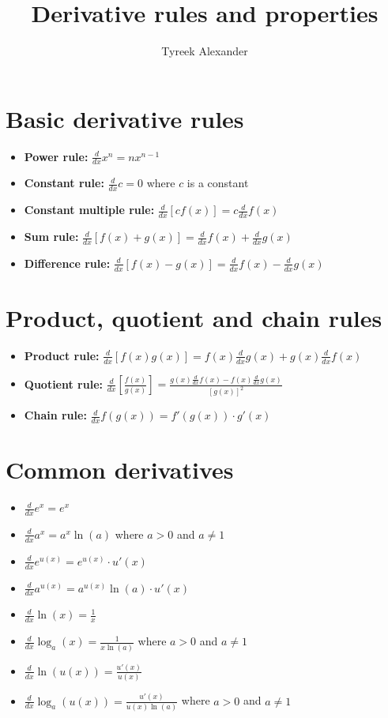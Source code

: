 \documentclass{article}
\title{Derivative rules and properties}
\author{}
\date{}
\begin{document}
\author{Tyreek Alexander}

\maketitle

\section*{Basic derivative rules}

\begin{itemize}
    \item \textbf{Power rule:} \(\frac{d}{dx} x^n = nx^{n-1}\)
    \item \textbf{Constant rule:} \(\frac{d}{dx} c = 0\) where \(c\) is a constant
    \item \textbf{Constant multiple rule:} \(\frac{d}{dx} [cf(x)] = c \frac{d}{dx} f(x)\)
    \item \textbf{Sum rule:} \(\frac{d}{dx} [f(x) + g(x)] = \frac{d}{dx} f(x) + \frac{d}{dx} g(x)\)
    \item \textbf{Difference rule:} \(\frac{d}{dx} [f(x) - g(x)] = \frac{d}{dx} f(x) - \frac{d}{dx} g(x)\)
\end{itemize}

\section*{Product, quotient and chain rules}

\begin{itemize}
    \item \textbf{Product rule:} \(\frac{d}{dx} [f(x)g(x)] = f(x) \frac{d}{dx} g(x) + g(x) \frac{d}{dx} f(x)\)
    \item \textbf{Quotient rule:} \(\frac{d}{dx} \left[ \frac{f(x)}{g(x)} \right] = \frac{g(x) \frac{d}{dx} f(x) - f(x) \frac{d}{dx} g(x)}{[g(x)]^2}\)
    \item \textbf{Chain rule:} \(\frac{d}{dx} f(g(x)) = f'(g(x)) \cdot g'(x)\)
\end{itemize}

\section*{Common derivatives}

\begin{itemize}
    \item \(\frac{d}{dx} e^x = e^x\)
    \item \(\frac{d}{dx} a^x = a^x \ln(a)\) where \(a > 0\) and \(a \neq 1\)
    \item \(\frac{d}{dx} e^{u(x)} = e^{u(x)} \cdot u'(x)\)
    \item \(\frac{d}{dx} a^{u(x)} = a^{u(x)} \ln(a) \cdot u'(x)\)
    \item \(\frac{d}{dx} \ln(x) = \frac{1}{x}\)
    \item \(\frac{d}{dx} \log_a(x) = \frac{1}{x \ln(a)}\) where \(a > 0\) and \(a \neq 1\)
    \item \(\frac{d}{dx} \ln(u(x)) = \frac{u'(x)}{u(x)}\)
    \item \(\frac{d}{dx} \log_a(u(x)) = \frac{u'(x)}{u(x) \ln(a)}\) where \(a > 0\) and \(a \neq 1\)
\end{itemize}
\end{document}
